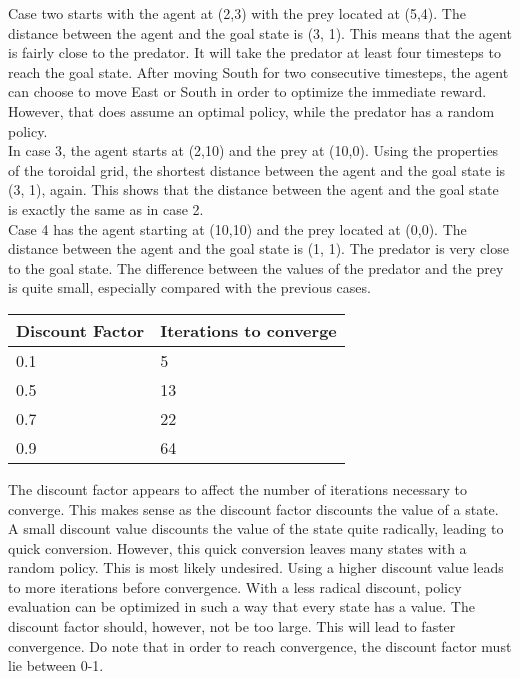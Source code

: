 \documentclass{article}
\begin{document}
Case two starts with the agent at (2,3) with the prey located at (5,4). The distance between the agent and the goal state is (3, 1). This means that the agent is fairly close to the predator. It will take the predator at least four timesteps to reach the goal state. After moving South for two consecutive timesteps, the agent can choose to move East or South in order to optimize the immediate reward. However, that does assume an optimal policy, while the predator has a random policy. \\

In case 3, the agent starts at (2,10) and the prey at (10,0). Using the properties of the toroidal grid, the shortest distance between the agent and the goal state is (3, 1), again. This shows that the distance between the agent and the goal state is exactly the same as in case 2. \\ 

Case 4 has the agent starting at (10,10) and the prey located at (0,0). The distance between the agent and the goal state is (1, 1). The predator is very close to the goal state. The difference between the values of the predator and the prey is quite small, especially compared with the previous cases.  \\


\begin{center}
	\begin{tabular}{ l || l }
		Discount Factor & Iterations to converge \\ 
		\hline
		0.1 & 5 \\
		0.5 & 13 \\
		0.7 & 22 \\
		0.9 & 64 \\	
	\end{tabular}
\end{center}

The discount factor appears to affect the number of iterations necessary to converge. This makes sense as the discount factor discounts the value of a state. A small discount value discounts the value of the state quite radically, leading to quick conversion. However, this quick conversion leaves many states with a random policy. This is most likely undesired. Using a higher discount value leads to more iterations before convergence. With a less radical discount, policy evaluation can be optimized in such a way that every state has a value. The discount factor should, however, not be too large. This will lead to faster convergence. Do note that in order to reach convergence, the discount factor must lie between 0-1.
\end{document}
